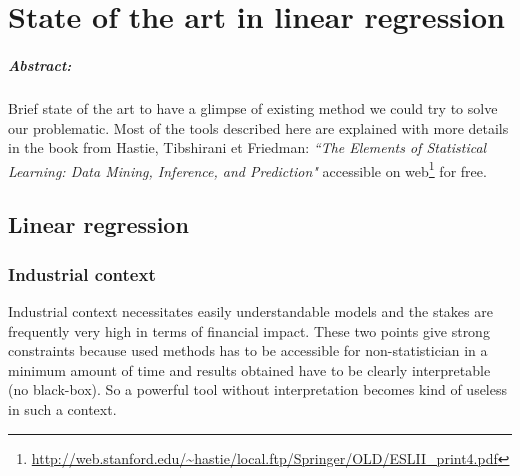 \documentclass[12pt,a4paper]{report}
\begin{document}
\chapter{State of the art in linear regression}
\paragraph{Abstract:} Brief state of the art to have a glimpse of existing method we could try to solve our problematic.
Most of the tools described here are explained with more details in the book from  Hastie, Tibshirani et Friedman: {\it ``The Elements of Statistical Learning: Data Mining, Inference, and Prediction" } accessible on web\footnote{ \url{http://web.stanford.edu/~hastie/local.ftp/Springer/OLD/ESLII_print4.pdf}} for free.
	

	
	\section{Linear regression}
%			
		\subsection{Industrial context}
		
			Industrial context necessitates easily understandable models and the stakes are frequently very high in terms of financial impact. 
		These two points give strong constraints because used methods has to be accessible for non-statistician in a minimum amount of time and results obtained have to be clearly interpretable (no black-box). So a powerful tool without interpretation becomes kind of useless in such a context.\\
		
\end{document}
